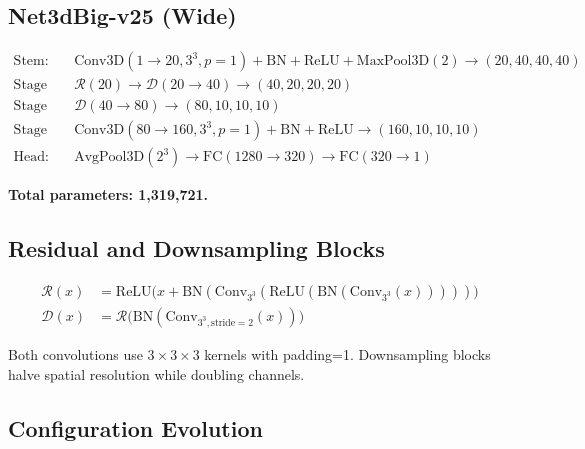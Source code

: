 \subsection{Net3dBig-v25 (Wide)}
\label{sec:net3dbig}

\begin{align*}
\text{Stem:} &\quad \text{Conv3D}(1\!\to\!20, 3^3, p=1) + \text{BN} + \text{ReLU} + \text{MaxPool3D}(2) \to (20, 40, 40, 40) \\
\text{Stage 1:} &\quad \mathcal{R}(20) \to \mathcal{D}(20\!\to\!40) \to (40, 20, 20, 20) \\
\text{Stage 2:} &\quad \mathcal{D}(40\!\to\!80) \to (80, 10, 10, 10) \\
\text{Stage 3:} &\quad \text{Conv3D}(80\!\to\!160, 3^3, p=1) + \text{BN} + \text{ReLU} \to (160, 10, 10, 10) \\
\text{Head:} &\quad \text{AvgPool3D}(2^3) \to \text{FC}(1280\!\to\!320) \to \text{FC}(320\!\to\!1)
\end{align*}

\textbf{Total parameters: 1,319,721.}

\subsection{Residual and Downsampling Blocks}
\label{sec:blocks}

\begin{align*}
\mathcal{R}(x) &= \text{ReLU}\big(x + \text{BN}(\text{Conv}_{3^3}(\text{ReLU}(\text{BN}(\text{Conv}_{3^3}(x)))))\big) \\
\mathcal{D}(x) &= \mathcal{R}\big(\text{BN}(\text{Conv}_{3^3,\text{stride}=2}(x))\big)
\end{align*}

Both convolutions use $3\times3\times3$ kernels with padding=1. Downsampling blocks halve spatial resolution while doubling channels.

\subsection{Configuration Evolution}
\label{sec:arch_evolution}

